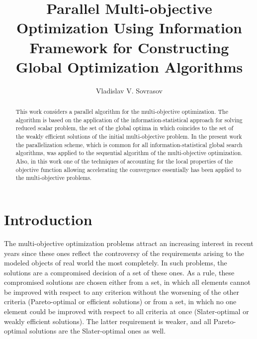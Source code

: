 \documentclass{llncs}
\begin{document}
%
\mainmatter              %
%
\title{Parallel Multi-objective Optimization Using Information Framework for
Constructing Global Optimization Algorithms}
%
%
\author{Vladislav V. Sovrasov}
%
%
%

\maketitle              %

\begin{abstract}
This work considers a parallel algorithm for the multi-objective optimization. The
algorithm is based on the application of the information-statistical approach for solving
reduced scalar problem, the set of the global optima in which coincides to the set of the
weakly efficient solutions of the initial multi-objective problem. In the present work the parallelization scheme, which is common for all information-statistical global search algorithms,
was applied to the sequential algorithm of the multi-objective optimization. Also, in this
work one of the techniques of accounting for the local properties of the objective function
allowing accelerating the convergence essentially has been applied to the multi-objective
problems.

\end{abstract}
%
\section{Introduction}
The multi-objective optimization problems attract an increasing interest in recent years since
these ones reflect the controversy of the requirements arising to the modeled objects of real
world the most completely. In such problems, the solutions are a compromised decision of a set
of these ones. As a rule, these compromised solutions are chosen either from a set, in which all
elements cannot be improved with respect to any criterion without the worsening of the other
criteria (Pareto-optimal or efficient solutions) or from a set, in which no one element could be
improved with respect to all criteria at once (Slater-optimal or weakly efficient solutions). The
latter requirement is weaker, and all Pareto-optimal solutions are the Slater-optimal ones as
well.
\end{document}
